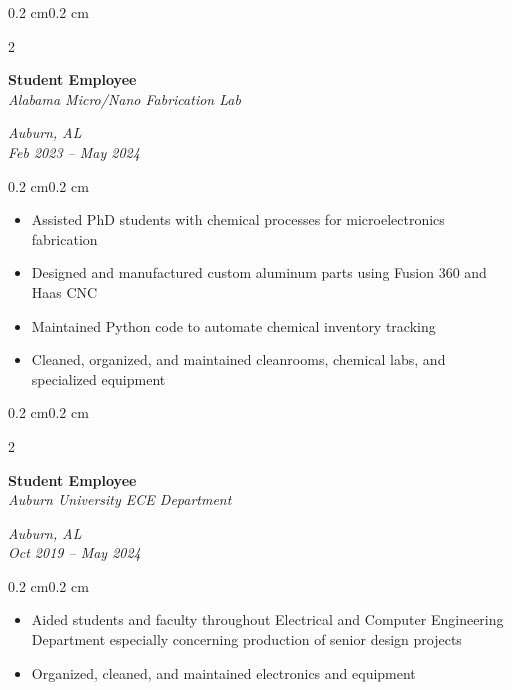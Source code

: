 \documentclass[10pt, letterpaper]{article}
\newenvironment{highlights}{
    \begin{itemize}[topsep=0.10 cm,parsep=0.10 cm,partopsep=0pt,itemsep=0pt,leftmargin=0.4 cm + 10pt]
}{
    \end{itemize}
}
\newenvironment{onecolentry}{
    \begin{adjustwidth}{0.2 cm}{0.2 cm}
}{
    \end{adjustwidth}
}
\newenvironment{twocolentry}[2][]{
    \onecolentry
    \def\secondColumn{#2}
    \setcolumnwidth{\fill, 4.5 cm}
    \begin{paracol}{2}
}{
    \switchcolumn \raggedleft \secondColumn
    \end{paracol}
    \endonecolentry
}
\begin{document}
        \vspace{0.2 cm}

        \begin{twocolentry}{\textit{Auburn, AL} \\ \textit{Feb 2023 – May 2024}}
            \textbf{Student Employee} \\
            \textit{Alabama Micro/Nano Fabrication Lab}
        \end{twocolentry}
        \vspace{0.10 cm}
        \begin{onecolentry}
            \begin{highlights}
                \item Assisted PhD students with chemical processes for microelectronics fabrication
                \item Designed and manufactured custom aluminum parts using Fusion 360 and Haas CNC
                \item Maintained Python code to automate chemical inventory tracking
                \item Cleaned, organized, and maintained cleanrooms, chemical labs, and specialized equipment
            \end{highlights}
        \end{onecolentry}

        \vspace{0.2 cm}

        \begin{twocolentry}{\textit{Auburn, AL} \\ \textit{Oct 2019 – May 2024}}
            \textbf{Student Employee} \\
            \textit{Auburn University ECE Department}
        \end{twocolentry}
        \vspace{0.10 cm}
        \begin{onecolentry}
            \begin{highlights}
                \item Aided students and faculty throughout Electrical and Computer Engineering Department especially concerning production of senior design projects
                \item Organized, cleaned, and maintained electronics and equipment
            \end{highlights}
        \end{onecolentry}

        \vspace{0.2 cm}
\end{document}
